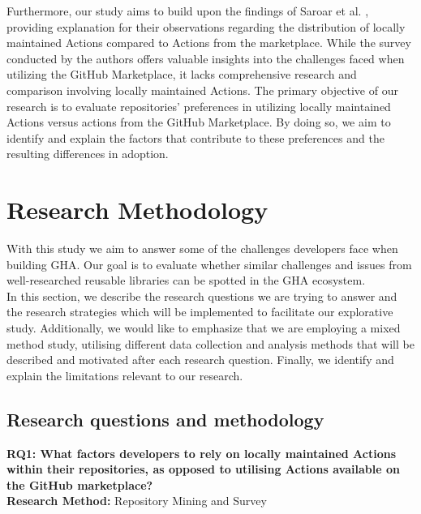 \documentclass[conference]{IEEEtran}
\begin{document}
	Furthermore, our study aims to build upon the findings of Saroar et al. \cite{saroar2023developers}, providing explanation for their observations regarding the distribution of locally maintained Actions compared to Actions from the marketplace. While the survey conducted by the authors offers valuable insights into the challenges faced when utilizing the GitHub Marketplace, it lacks comprehensive research and comparison involving locally maintained Actions. The primary objective of our research is to evaluate repositories' preferences in utilizing locally maintained Actions versus actions from the GitHub Marketplace. By doing so, we aim to identify and explain the factors that contribute to these preferences and the resulting differences in adoption.




\section{Research Methodology}
    With this study we aim to answer some of the challenges developers face when building GHA. Our goal is to evaluate whether similar challenges and issues from well-researched reusable libraries can be spotted in the GHA ecosystem.\\

    In this section, we describe the research questions we are trying to answer and the research strategies which will be implemented to facilitate our explorative study. Additionally, we would like to emphasize that we are employing a mixed method study, utilising different data collection and analysis methods that will be described and motivated after each research question. Finally, we identify and explain the limitations relevant to our research.

    \subsection{Research questions and methodology}


        \textbf{RQ1: What factors developers to rely on locally maintained Actions within their repositories, as opposed to utilising Actions available on the GitHub marketplace?}\\

        \textbf{Research Method:}  Repository Mining and Survey\\
            
\end{document}
